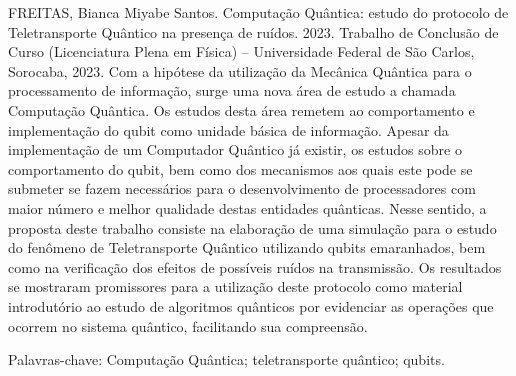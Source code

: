 
\begin{resumo} %
  FREITAS, Bianca Miyabe Santos. Computação Quântica: estudo do protocolo de Teletransporte Quântico na presença de ruídos. 2023. Trabalho de Conclusão de Curso (Licenciatura Plena em Física) -- Universidade Federal de São Carlos, Sorocaba, 2023.
  \vspace*{\onelineskip}
	Com a hipótese da utilização da Mecânica Quântica para o processamento de informação, surge uma nova área de estudo a chamada Computação Quântica. Os estudos desta área remetem ao comportamento e implementação do qubit como unidade básica de informação. Apesar da implementação de um Computador Quântico já existir, os estudos sobre o comportamento do qubit, bem como dos mecanismos aos quais este pode se submeter se fazem necessários para o desenvolvimento de processadores com maior número e melhor qualidade
destas entidades quânticas. Nesse sentido, a proposta deste trabalho consiste na elaboração de uma simulação para o estudo do fenômeno de Teletransporte Quântico utilizando qubits emaranhados, bem como na verificação dos efeitos de possíveis ruídos na transmissão. Os resultados se mostraram promissores para a utilização deste protocolo como material introdutório ao estudo de algoritmos quânticos por evidenciar as operações que ocorrem no sistema quântico, facilitando sua compreensão.

  \vspace{\onelineskip}

  \noindent
  Palavras-chave: Computação Quântica; teletransporte quântico; qubits.
\end{resumo}

\cleardoublepage

